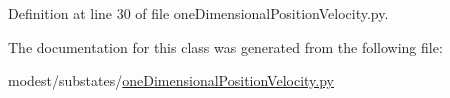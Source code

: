 Definition at line 30 of file one\+Dimensional\+Position\+Velocity.\+py.



The documentation for this class was generated from the following file\+:\begin{DoxyCompactItemize}
\item 
modest/substates/\hyperlink{oneDimensionalPositionVelocity_8py}{one\+Dimensional\+Position\+Velocity.\+py}\end{DoxyCompactItemize}
